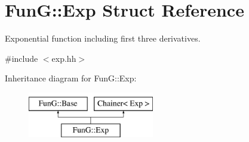 \hypertarget{structFunG_1_1Exp}{\section{Fun\-G\-:\-:Exp Struct Reference}
\label{structFunG_1_1Exp}
}


Exponential function including first three derivatives.  




{\ttfamily \#include $<$exp.\-hh$>$}

Inheritance diagram for Fun\-G\-:\-:Exp\-:\begin{figure}[H]
\begin{center}
\leavevmode
\includegraphics[height=2.000000cm]{structFunG_1_1Exp}
\end{center}
\end{figure}
